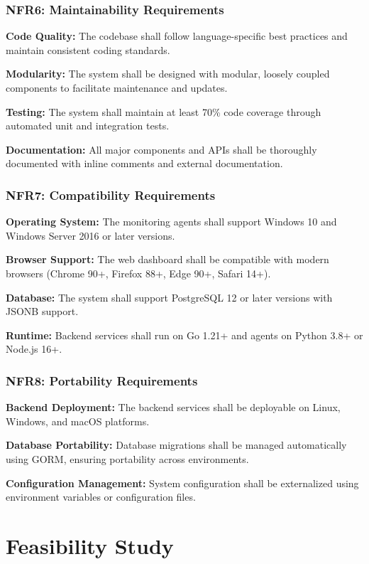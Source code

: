 \subsubsection{NFR6: Maintainability Requirements}

\textbf{Code Quality:} The codebase shall follow language-specific best practices and maintain consistent coding standards.

\textbf{Modularity:} The system shall be designed with modular, loosely coupled components to facilitate maintenance and updates.

\textbf{Testing:} The system shall maintain at least 70\% code coverage through automated unit and integration tests.

\textbf{Documentation:} All major components and APIs shall be thoroughly documented with inline comments and external documentation.

\subsubsection{NFR7: Compatibility Requirements}

\textbf{Operating System:} The monitoring agents shall support Windows 10 and Windows Server 2016 or later versions.

\textbf{Browser Support:} The web dashboard shall be compatible with modern browsers (Chrome 90+, Firefox 88+, Edge 90+, Safari 14+).

\textbf{Database:} The system shall support PostgreSQL 12 or later versions with JSONB support.

\textbf{Runtime:} Backend services shall run on Go 1.21+ and agents on Python 3.8+ or Node.js 16+.

\subsubsection{NFR8: Portability Requirements}

\textbf{Backend Deployment:} The backend services shall be deployable on Linux, Windows, and macOS platforms.

\textbf{Database Portability:} Database migrations shall be managed automatically using GORM, ensuring portability across environments.

\textbf{Configuration Management:} System configuration shall be externalized using environment variables or configuration files.

\section{Feasibility Study}


